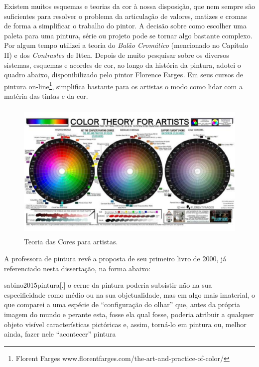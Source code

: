 Existem muitos esquemas e teorias da cor à nossa disposição, que nem
sempre são suficientes para resolver o problema da articulação de
valores, matizes e cromas de forma a simplificar o trabalho do pintor.
A decisão sobre como escolher uma paleta para uma pintura, série ou
projeto pode se tornar algo bastante complexo. Por algum tempo utilizei
a teoria do \emph{Balão Cromático} (mencionado no Capítulo II) e dos
\emph{Contrastes} de Itten. Depois de muito pesquisar sobre os diversos
sistemas, esquemas e acordes de cor, ao longo da história da pintura,
adotei o quadro abaixo, disponibilizado pelo pintor Florence
Farges\emph{.} Em seus cursos de pintura on-line\footnote{Florent
	Farges www.florentfarges.com/the-art-and-practice-of-color/},
simplifica bastante para os artistas o modo como lidar com a matéria
das tintas e da cor.

\begin{figure}
	\caption{Teoria das Cores para artistas.}

	\includegraphics[width=4.7094in,height=2.64897in]{figuras/color-theory-for-artists.pdf.compressed.pdf}
\end{figure}

A professora de pintura \parencite{sabino2015pintura} revê a proposta de seu primeiro livro de
2000, já referenciado nesta dissertação, na forma abaixo:

\begin{displaycquote}[33]{sabino2015pintura}[.]
	o cerne da pintura poderia subsistir não na sua especificidade como
	médio ou na sua objetualidade, mas em algo mais imaterial, o que
	comparei a uma espécie de \enquote{configuração do olhar} que, antes da própria
	imagem do mundo e perante esta, fosse ela qual fosse, poderia atribuir a
	qualquer objeto visível características pictóricas e, assim, torná-lo em
	pintura ou, melhor ainda, fazer nele \enquote{acontecer} pintura
\end{displaycquote}

